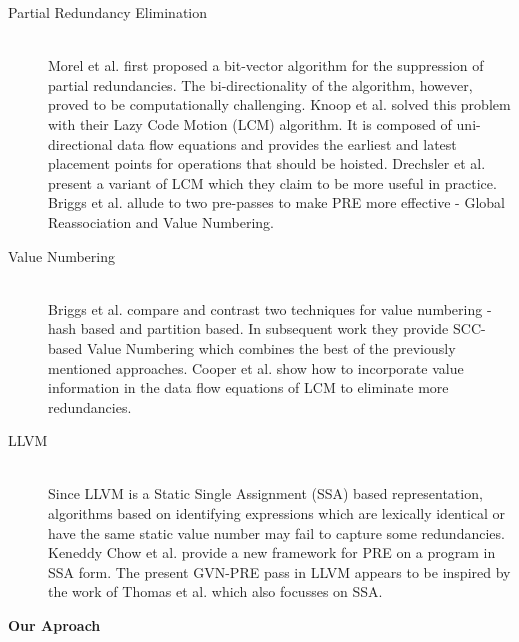 \documentclass[10pt,twoside]{report}
\begin{document}
\begin{description}
\item [Partial Redundancy Elimination]    \hfill \\
Morel et al. \cite{Morel} first proposed a bit-vector algorithm for the
suppression of partial redundancies. The bi-directionality of the algorithm,
            however, proved to be computationally challenging. Knoop et al.
            \cite{Knoop} solved this problem with their Lazy Code Motion (LCM)
  algorithm. It is composed of uni-directional data flow equations and provides
  the earliest and latest placement points for operations that should be
  hoisted. Drechsler et al. \cite{Drechsler} present a variant of LCM which they claim to
  be more useful in practice. Briggs et al. \cite{Briggs2} allude to two
  pre-passes to make PRE more effective - Global Reassociation and Value
  Numbering.

\item [Value Numbering] \hfill \\
Briggs et al. \cite{Briggs} compare and contrast two techniques for
value numbering - hash based\cite{CS} and partition based\cite{AWZ}. In subsequent work they
provide SCC-based Value Numbering \cite{Cooper95scc-basedvalue}  which combines
the best of the previously mentioned approaches. Cooper et al.
\cite{CVDC} show how to incorporate value
information in the data flow equations of LCM to eliminate more redundancies.

\item [LLVM] \hfill \\
Since LLVM is a Static Single Assignment (SSA) based representation, algorithms
based on identifying expressions which are lexically identical or have the same
static value number may fail to capture some redundancies.
Keneddy Chow et al.
\cite{Kennedy99partialredundancy} provide a new framework for PRE on a program
in SSA form. The present GVN-PRE pass in LLVM appears to be inspired by the
work of Thomas et al. \cite{Vandrunen04value-basedpartial} which also focusses
on SSA.
\end{description}

\begin{flushleft}
\textbf{\Large{Our Aproach}}
\end{flushleft}
\end{document}
